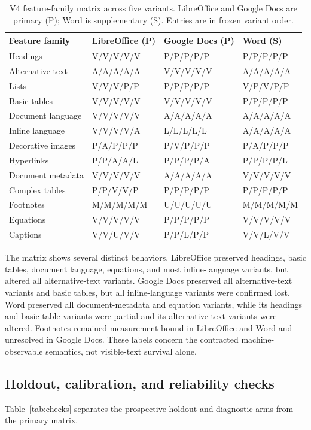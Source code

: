 \begin{table}[t]
\centering\scriptsize
\caption{V4 feature-family matrix across five variants. LibreOffice and Google Docs are primary (P); Word is supplementary (S). Entries are in frozen variant order.}
\label{tab:matrix}
\begin{tabular}{p{}p{}p{}p{}}
\toprule
Feature family & LibreOffice (P) & Google Docs (P) & Word (S) \\
\midrule
Headings & V/V/V/V/V & P/P/P/P/P & P/P/P/P/P \\
Alternative text & A/A/A/A/A & V/V/V/V/V & A/A/A/A/A \\
Lists & V/V/V/P/P & P/P/P/P/P & V/P/V/P/P \\
Basic tables & V/V/V/V/V & V/V/V/V/V & P/P/P/P/P \\
Document language & V/V/V/V/V & A/A/A/A/A & A/A/A/A/A \\
Inline language & V/V/V/V/A & L/L/L/L/L & A/A/A/A/A \\
Decorative images & P/A/P/P/P & P/V/P/P/P & P/A/P/P/P \\
Hyperlinks & P/P/A/A/L & P/P/P/P/A & P/P/P/P/L \\
Document metadata & V/V/V/V/V & A/A/A/A/A & V/V/V/V/V \\
Complex tables & P/P/V/V/P & P/P/P/P/P & P/P/P/P/P \\
Footnotes & M/M/M/M/M & U/U/U/U/U & M/M/M/M/M \\
Equations & V/V/V/V/V & P/P/P/P/P & V/V/V/V/V \\
Captions & V/V/U/V/V & P/P/L/P/P & V/V/L/V/V \\
\bottomrule
\end{tabular}
\end{table}

The matrix shows several distinct behaviors. LibreOffice preserved headings, basic tables, document language, equations, and most inline-language variants, but altered all alternative-text variants. Google Docs preserved all alternative-text variants and basic tables, but all inline-language variants were confirmed lost. Word preserved all document-metadata and equation variants, while its headings and basic-table variants were partial and its alternative-text variants were altered. Footnotes remained measurement-bound in LibreOffice and Word and unresolved in Google Docs. These labels concern the contracted machine-observable semantics, not visible-text survival alone.

\subsection{Holdout, calibration, and reliability checks}
Table~\ref{tab:checks} separates the prospective holdout and diagnostic arms from the primary matrix.

